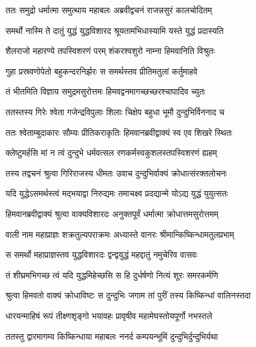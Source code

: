 \twolineshloka
{ततः समुद्रो धर्मात्मा समुत्थाय महाबलः}
{अब्रवीद्वचनं राजन्नसुरं कालचोदितम्} %

\twolineshloka
{समर्थो नास्मि ते दातुं युद्धं युद्धविशारद}
{श्रूयतामभिधास्यामि यस्ते युद्धं प्रदास्यति} %

\twolineshloka
{शैलराजो महारण्ये तपस्विशरणं परम्}
{शंकरश्वशुरो नाम्ना हिमवानिति विश्रुतः} %

\twolineshloka
{गुहा प्रस्रवणोपेतो बहुकन्दरनिर्झरः}
{स समर्थस्तव प्रीतिमतुलां कर्तुमाहवे} %

\twolineshloka
{तं भीतमिति विज्ञाय समुद्रमसुरोत्तमः}
{हिमवद्वनमागच्छच्छरश्चापादिव च्युतः} %

\twolineshloka
{ततस्तस्य गिरेः श्वेता गजेन्द्रविपुलाः शिलाः}
{चिक्षेप बहुधा भूमौ दुन्दुभिर्विननाद च} %

\twolineshloka
{ततः श्वेताम्बुदाकारः सौम्यः प्रीतिकराकृतिः}
{हिमवानब्रवीद्वाक्यं स्व एव शिखरे स्थितः} %

\twolineshloka
{क्लेष्टुमर्हसि मां न त्वं दुन्दुभे धर्मवत्सल}
{रणकर्मस्वकुशलस्तपस्विशरणं ह्यहम्} %

\twolineshloka
{तस्य तद्वचनं श्रुत्वा गिरिराजस्य धीमतः}
{उवाच दुन्दुभिर्वाक्यं क्रोधात्संरक्तलोचनः} %

\twolineshloka
{यदि युद्धेऽसमर्थस्त्वं मद्भयाद्वा निरुद्यमः}
{तमाचक्ष्व प्रदद्यान्मे योऽद्य युद्धं युयुत्सतः} %

\twolineshloka
{हिमवानब्रवीद्वाक्यं श्रुत्वा वाक्यविशारदः}
{अनुक्तपूर्वं धर्मात्मा क्रोधात्तमसुरोत्तमम्} %

\twolineshloka
{वाली नाम महाप्राज्ञः शक्रतुल्यपराक्रमः}
{अध्यास्ते वानरः श्रीमान्किष्किन्धामतुलप्रभाम्} %

\twolineshloka
{स समर्थो महाप्राज्ञस्तव युद्धविशारदः}
{द्वन्द्वयुद्धं महद्दातुं नमुचेरिव वासवः} %

\twolineshloka
{तं शीघ्रमभिगच्छ त्वं यदि युद्धमिहेच्छसि}
{स हि दुर्धर्षणो नित्यं शूरः समरकर्मणि} %

\twolineshloka
{श्रुत्वा हिमवतो वाक्यं क्रोधाविष्टः स दुन्दुभिः}
{जगाम तां पुरीं तस्य किष्किन्धां वालिनस्तदा} %

\twolineshloka
{धारयन्माहिषं रूपं तीक्ष्णशृङ्गो भयावहः}
{प्रावृषीव महामेघस्तोयपूर्णो नभस्तले} %

\twolineshloka
{ततस्तु द्वारमागम्य किष्किन्धाया महाबलः}
{ननर्द कम्पयन्भूमिं दुन्दुभिर्दुन्दुभिर्यथा} %

